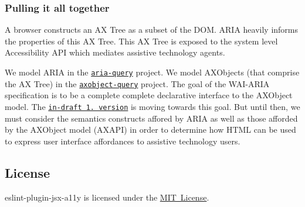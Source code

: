 \subsubsection*{Pulling it all together}

 A browser constructs an AX Tree as a subset of the D\+OM. A\+R\+IA heavily informs the properties of this AX Tree. This AX Tree is exposed to the system level Accessibility A\+PI which mediates assistive technology agents.

We model A\+R\+IA in the \href{https://github.com/a11yance/aria-query}{\tt aria-\/query} project. We model A\+X\+Objects (that comprise the AX Tree) in the \href{https://github.com/A11yance/axobject-query}{\tt axobject-\/query} project. The goal of the W\+A\+I-\/\+A\+R\+IA specification is to be a complete complete declarative interface to the A\+X\+Object model. The \href{https://github.com/w3c/aria/issues?q=is%3Aissue+is%3Aopen+label%3A%22ARIA+1.2%22}{\tt in-\/draft 1.\+2 version} is moving towards this goal. But until then, we must consider the semantics constructs affored by A\+R\+IA as well as those afforded by the A\+X\+Object model (A\+X\+A\+PI) in order to determine how H\+T\+ML can be used to express user interface affordances to assistive technology users.

\subsection*{License}



eslint-\/plugin-\/jsx-\/a11y is licensed under the \mbox{\hyperlink{worker-farm_2_l_i_c_e_n_s_e_8md}{M\+IT License}}. 